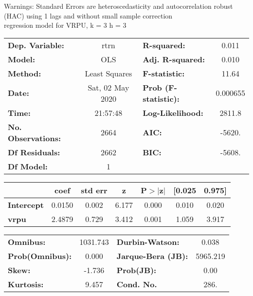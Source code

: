 Warnings: \newline
 [1] Standard Errors are heteroscedasticity and autocorrelation robust (HAC) using 1 lags and without small sample correction\\ 

regression model for VRPU, k = 3 h = 3\begin{center}
\begin{tabular}{lclc}
\toprule
\textbf{Dep. Variable:}    &       rtrn       & \textbf{  R-squared:         } &     0.011   \\
\textbf{Model:}            &       OLS        & \textbf{  Adj. R-squared:    } &     0.010   \\
\textbf{Method:}           &  Least Squares   & \textbf{  F-statistic:       } &     11.64   \\
\textbf{Date:}             & Sat, 02 May 2020 & \textbf{  Prob (F-statistic):} &  0.000655   \\
\textbf{Time:}             &     21:57:48     & \textbf{  Log-Likelihood:    } &    2811.8   \\
\textbf{No. Observations:} &        2664      & \textbf{  AIC:               } &    -5620.   \\
\textbf{Df Residuals:}     &        2662      & \textbf{  BIC:               } &    -5608.   \\
\textbf{Df Model:}         &           1      & \textbf{                     } &             \\
\bottomrule
\end{tabular}
\begin{tabular}{lcccccc}
                   & \textbf{coef} & \textbf{std err} & \textbf{z} & \textbf{P$> |$z$|$} & \textbf{[0.025} & \textbf{0.975]}  \\
\midrule
\textbf{Intercept} &       0.0150  &        0.002     &     6.177  &         0.000        &        0.010    &        0.020     \\
\textbf{vrpu}      &       2.4879  &        0.729     &     3.412  &         0.001        &        1.059    &        3.917     \\
\bottomrule
\end{tabular}
\begin{tabular}{lclc}
\textbf{Omnibus:}       & 1031.743 & \textbf{  Durbin-Watson:     } &    0.038  \\
\textbf{Prob(Omnibus):} &   0.000  & \textbf{  Jarque-Bera (JB):  } & 5965.219  \\
\textbf{Skew:}          &  -1.736  & \textbf{  Prob(JB):          } &     0.00  \\
\textbf{Kurtosis:}      &   9.457  & \textbf{  Cond. No.          } &     286.  \\
\bottomrule
\end{tabular}
\end{center}

